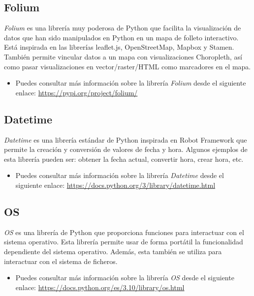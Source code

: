 \subsection{Folium}

\textit{Folium} es una librería muy poderosa de Python que facilita la visualización de datos que han sido manipulados en Python en un mapa de folleto interactivo. Está inspirada en las librerías leaflet.js, OpenStreetMap, Mapbox y Stamen.
También permite vincular datos a un mapa con visualizaciones Choropleth, así como pasar visualizaciones en vector/raster/HTML como marcadores en el mapa.

\begin{itemize}
    \item Puedes consultar más información sobre la librería \textit{Folium} desde el siguiente enlace: \url{https://pypi.org/project/folium/}
\end{itemize}

\subsection{Datetime}

\textit{Datetime} es una librería estándar de Python inspirada en Robot Framework que permite la creación y conversión de valores de fecha y hora. Algunos ejemplos de esta librería pueden ser: obtener la fecha actual, convertir hora, crear hora, etc.
 
\begin{itemize}
    \item Puedes consultar más información sobre la librería \textit{Datetime} desde el siguiente enlace: \url{https://docs.python.org/3/library/datetime.html}
\end{itemize}

\subsection{OS}

\textit{OS} es una librería de Python que proporciona funciones para interactuar con el sistema operativo. Esta librería permite usar de forma portátil la funcionalidad dependiente del sistema operativo. Además, esta también se utiliza para interactuar con el sistema de ficheros.

\begin{itemize}
    \item Puedes consultar más información sobre la librería \textit{OS} desde el siguiente enlace: \url{https://docs.python.org/es/3.10/library/os.html}
\end{itemize}


